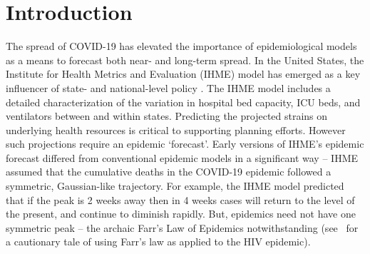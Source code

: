 \section{Introduction}
The spread of COVID-19 has elevated the importance of epidemiological
models as a means to forecast both near- and long-term spread. 
In the United States, the Institute for Health Metrics and Evaluation (IHME)
model has emerged as a key influencer of state- and national-level
policy \citep{covid2020forecasting}.  
The IHME model includes a detailed characterization
of the variation in
hospital bed capacity, ICU beds, and ventilators between and within
states. Predicting the projected strains on underlying
health resources is critical to supporting planning efforts.
However such projections require
an epidemic `forecast'.  Early versions of IHME's epidemic forecast
differed from conventional
epidemic models in a significant way -- IHME assumed
that the cumulative deaths in the COVID-19 epidemic 
followed a symmetric, Gaussian-like trajectory. 
For example, the 
IHME model predicted that if the peak is 2 weeks away then in 4 weeks
cases will return to the level of the present, and continue
to diminish rapidly.  But, epidemics need not have one symmetric peak -- 
the archaic Farr's Law of Epidemics notwithstanding
(see~\citep{bregman1990farr} for a cautionary tale of using
Farr's law as applied to the HIV epidemic). 
